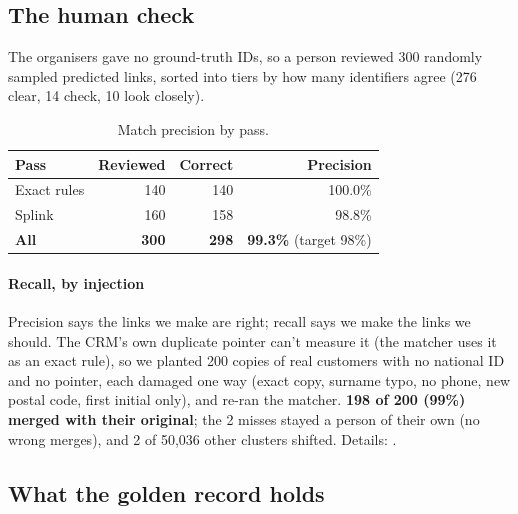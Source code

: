 \documentclass[11pt]{article}
\begin{document}
\subsection{The human check}

The organisers gave no ground-truth IDs, so a person reviewed 300 randomly sampled predicted links, sorted into tiers by
how many identifiers agree (276 clear, 14 check, 10 look closely).


\begin{table}[htbp]\small\centering
\begin{tabular}{@{}lrrr@{}}
\toprule
\textbf{Pass} & \textbf{Reviewed} & \textbf{Correct} & \textbf{Precision} \\
\midrule
Exact rules & 140 & 140 & 100.0\% \\
Splink & 160 & 158 & 98.8\% \\
\textbf{All} & \textbf{300} & \textbf{298} & \textbf{99.3\%} (target 98\%) \\
\bottomrule
\end{tabular}
\caption{Match precision by pass.}
\end{table}


\paragraph{Recall, by injection} Precision says the links we make are right; recall says we make the links we should.
The CRM's own duplicate pointer can't measure it (the matcher uses it as an exact rule), so we planted 200 copies of real
customers with no national ID and no pointer, each damaged one way (exact copy, surname typo, no phone, new postal code,
first initial only), and re-ran the matcher. \textbf{198 of 200 (99\%) merged with their original}; the 2 misses stayed a
person of their own (no wrong merges), and 2 of 50,036 other clusters shifted. Details: .

\subsection{What the golden record holds}
\end{document}
